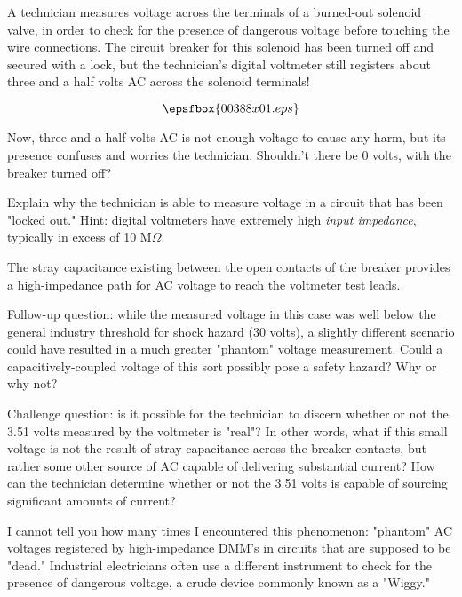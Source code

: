 

A technician measures voltage across the terminals of a burned-out solenoid valve, in order to check for the presence of dangerous voltage before touching the wire connections.  The circuit breaker for this solenoid has been turned off and secured with a lock, but the technician's digital voltmeter still registers about three and a half volts AC across the solenoid terminals!

$$\epsfbox{00388x01.eps}$$

Now, three and a half volts AC is not enough voltage to cause any harm, but its presence confuses and worries the technician.  Shouldn't there be 0 volts, with the breaker turned off?  

Explain why the technician is able to measure voltage in a circuit that has been "locked out."  Hint: digital voltmeters have extremely high {\it input impedance}, typically in excess of 10 M$\Omega$.







The stray capacitance existing between the open contacts of the breaker provides a high-impedance path for AC voltage to reach the voltmeter test leads.

\vskip 10pt

Follow-up question: while the measured voltage in this case was well below the general industry threshold for shock hazard (30 volts), a slightly different scenario could have resulted in a much greater "phantom" voltage measurement.  Could a capacitively-coupled voltage of this sort possibly pose a safety hazard?  Why or why not?

\vskip 10pt

Challenge question: is it possible for the technician to discern whether or not the 3.51 volts measured by the voltmeter is "real"?  In other words, what if this small voltage is not the result of stray capacitance across the breaker contacts, but rather some other source of AC capable of delivering substantial current?  How can the technician determine whether or not the 3.51 volts is capable of sourcing significant amounts of current?







I cannot tell you how many times I encountered this phenomenon: "phantom" AC voltages registered by high-impedance DMM's in circuits that are supposed to be "dead."  Industrial electricians often use a different instrument to check for the presence of dangerous voltage, a crude device commonly known as a "Wiggy."





